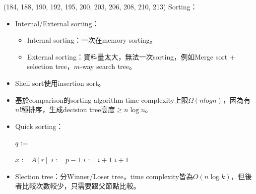 \item \begin{theorem}{(184, 188, 190, 192, 195, 200, 203, 206, 208, 210, 213)} Sorting：\begin{itemize}
        \item Internal/External sorting：\begin{itemize}
            \item Internal sorting：一次在memory sorting。
            \item External sorting：資料量太大，無法一次sorting，例如Merge sort + selection tree，$m$-way search tree。
        \end{itemize}
        \item Shell sort使用insertion sort。
        \item 基於comparison的sorting algorithm time complexity上限$\Omega(nlog n)$，因為有$n!$種排序，生成decision tree高度$\ge n\log n$。
        \item Quick sorting：
        \begin{algorithm}[H]
            \begin{algorithmic}[1]
                 
                        \State $q$ := 
                        \State {}
                        \State {}
                    \EndIf
                \EndFunction
            \end{algorithmic}
        \end{algorithm}
        \begin{algorithm}[H]
            \begin{algorithmic}[1]
                    \State $x$ := $A[r]$ 
                    \State $i$ := $p - 1$
                            \State $i$ := $i + 1$
                            \State {}
                        \EndIf
                    \EndFor
                    \State {}
                    \State \Return $i + 1$
                \EndFunction
            \end{algorithmic}
        \end{algorithm}
        \item Slection tree：分Winner/Loser tree，time complexity皆為$O(n\log k)$，但後者比較次數較少，只需要跟父節點比較。

\end{itemize}
\end{theorem}

